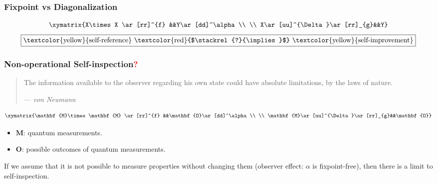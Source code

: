 \documentclass[UTF8,aspectratio=43,11pt,colorlinks,compress,openany]{beamer}%
\begin{document}
\begin{frame}\frametitle{Fixpoint vs Diagonalization}
	\[\xymatrix{X\times X
		\ar[rr]^{f} &&Y\ar[dd]^\alpha
		\\
		\\
		X\ar[uu]^{\Delta}\ar[rr]_{g}&&Y}\]
	\scalebox{.85}{
		\begin{minipage}{\textwidth}
\[\hspace*{-9pt}
\begin{array}{ccccccccc}
\hline
\hline
\mbox{Curry } \mathbf{Y}&\hat{=} &\lambda\mbox{-fixpoint}&\hat{=} &\mbox{\textcolor{green}{G\"odel}}&\hat{=} &\mbox{\textcolor{green}{Kleene}}&\hat{=} &\mbox{Russell}\\
\hline
yx &\hat{=} &N\left(\ulcorner M\urcorner\right) &\hat{=} &N(\ulcorner M(x)\urcorner) &\hat{=} &\varphi_n(m) &\hat{=} &x\in y\\
xx &\hat{=} &M\left(\ulcorner M\urcorner\right) &\hat{=} &M(\ulcorner M(x)\urcorner) &\hat{=} &\varphi_n(n) &\hat{=} &x\in x\\
y(xx) &\hat{=} &F\ulcorner M\ulcorner M\urcorner\urcorner &\hat{=} &F(\ulcorner M(\ulcorner M(x)\urcorner)\urcorner) &\hat{=} &h(\varphi_n(n)) &\hat{=} &x\notin x\\
\lambda x.y(xx) &\hat{=} &W &\hat{=} &W(x) &\hat{=} &\varphi_t(n) &\hat{=} &x\notin R\\
(\lambda x.y(xx))(\lambda x.y(xx)) &\hat{=} &W\left(\ulcorner W\urcorner\right) &\hat{=} &W(\ulcorner W(x)\urcorner) &\hat{=} &\varphi_t(t) &\hat{=} &R\notin R\\
\hline
\end{array}
\]
	\end{minipage}}
	\[\fbox{\textcolor{yellow}{self-reference} \textcolor{red}{$\stackrel{?}{\implies}$} \textcolor{yellow}{self-improvement}}\]
\end{frame}

\begin{frame}\frametitle{Non-operational Self-inspection\textcolor{red}{\textbf{?}}}
\begin{quote}
	The information available to the observer regarding his own state could have absolute limitations, by the laws of nature.\par\hfill --- \textsl{von Neumann}
\end{quote}
	\[\xymatrix{\mathbf{M}\times\mathbf{M}
		\ar[rr]^{f} &&\mathbf{O}\ar[dd]^\alpha
		\\
		\\
		\mathbf{M}\ar[uu]^{\Delta}\ar[rr]_{g}&&\mathbf{O}}\]
\begin{itemize}
	\item $\mathbf{M}$: quantum measurements.
	\item $\mathbf{O}$: possible outcomes of quantum measurements.
\end{itemize}
	If we assume that it is not possible to measure properties without changing them (observer effect: $\alpha$ is fixpoint-free), then there is a limit to self-inspection.
\end{frame}
\end{document}
